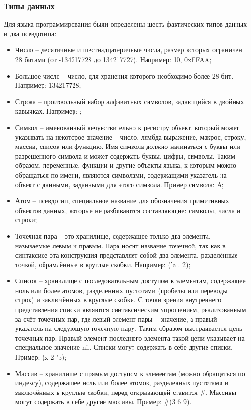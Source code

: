 \subsubsection{Типы данных}
Для языка программирования были определены шесть фактических типов данных и два псевдотипа:
\begin{itemize}
	\item Число -- десятичные и шестнадцатеричные числа, размер которых ограничен 28 битами (от -134217728 до 134217727). Например: 10, 0xFFAA;
	
	\item Большое число -- число, для хранения которого необходимо более 28 бит. Например: 134217728;
	
	\item Строка -- произвольный набор алфавитных символов, задающийся в двойных кавычках. Например: ;
	
	\item Символ -- именованный нечувствительно к регистру объект, который может указывать на некоторое значение -- число, лямбда-выражение, макрос, строку, массив, список или функцию. Имя символа должно начинаться с буквы или разрешенного символа и может содержать буквы, цифры, символы. Таким образом, переменные, функции и другие объекты языка, к которым можно обращаться по имени, являются символами, содержащими указатель на объект с данными, заданными для этого символа. Пример символа: A;
	
	\item Атом -- псевдотип, специальное название для обозначения примитивных объектов данных, которые не разбиваются составляющие: символы, числа и строки;
	
	\item Точечная пара -- это хранилище, содержащее только два элемента, называемые левым и правым. Пара носит название точечной, так как в синтаксисе эта конструкция представляет собой два элемента, разделённые точкой, обрамлённые в круглые скобки. Например: ('a . 2);
	
	\item Список -- хранилище с последовательным доступом к элементам, содержащее ноль или более атомов, разделенных пустотами (пробелы или переводы строк) и заключённых в круглые скобки. С точки зрения внутреннего представления списки являются синтаксическим упрощением, реализованным за счёт точечных пар, где левый элемент пары -- значение, а правый -- указатель на следующую точечную пару. Таким образом выстраивается цепь точечных пар. Правый элемент последнего элемента такой цепи указывает на специальное значение nil. Списки могут содержать в себе другие списки. Пример: (x 2 'p);
	
	\item Массив -- хранилище с прямым доступом к элементам (можно обращаться по индексу), содержащее ноль или более атомов, разделенных пустотами и заключённых в круглые скобки, перед открывающей ставится \#. Массивы могут содержать в себе другие массивы. Пример: \#(3 6 9).
\end{itemize}

